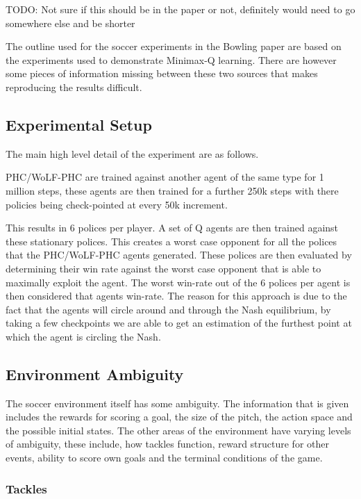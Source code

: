 \documentclass{article}
\newcommand\TODO[1]{{\color{red}TODO: #1}}
\begin{document}
\TODO{Not sure if this should be in the paper or not, definitely would need to go somewhere else and be shorter}

The outline used for the soccer experiments in the Bowling paper are based on the experiments used to demonstrate Minimax-Q learning. There are however some pieces of information missing between these two sources that makes reproducing the results difficult. 

\subsection*{Experimental Setup}

The main high level detail of the experiment are as follows.

PHC/WoLF-PHC are trained against another agent of the same type for 1 million steps, these agents are then trained for a further 250k steps with there policies being check-pointed at every 50k increment.

This results in 6 polices per player. A set of Q agents are then trained against these stationary polices. This creates a worst case opponent for all the polices that the PHC/WoLF-PHC agents generated. These polices are then evaluated by determining their win rate against the worst case opponent that is able to maximally exploit the agent. The worst win-rate out of the 6 polices per agent is then considered that agents win-rate. The reason for this approach is due to the fact that the agents will circle around and through the Nash equilibrium, by taking a few checkpoints we are able to get an estimation of the furthest point at which the agent is circling the Nash. 

\subsection*{Environment Ambiguity}

The soccer environment itself has some ambiguity. The information that is given includes the rewards for scoring a goal, the size of the pitch, the action space and the possible initial states. The other areas of the environment have varying levels of ambiguity, these include, how tackles function, reward structure for other events, ability to score own goals and the terminal conditions of the game.

\subsubsection*{Tackles}
\end{document}
